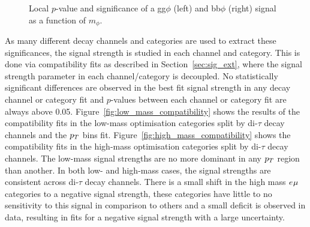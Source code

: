 \begin{figure}[!hbtp]
\centering
\caption{Local $p$-value and significance of a gg$\phi$ (left) and bb$\phi$ (right) signal as a function of $m_{\phi}$.}
\label{fig:significance}
\end{figure}

As many different decay channels and categories are used to extract these significances, the signal strength is studied in each channel and category.
This is done via compatibility fits as described in Section~\ref{sec:sig_ext}, where the signal strength parameter in each channel/category is decoupled.
No statistically significant differences are observed in the best fit signal strength in any decay channel or category fit and $p$-values between each channel or category fit are always above 0.05.
Figure~\ref{fig:low_mass_compatibility} shows the results of the compatibility fits in the low-mass optimisation categories split by di-$\tau$ decay channels and the $p_{T}$ bins fit. 
Figure~\ref{fig:high_mass_compatibility} shows the compatibility fits in the high-mass optimisation categories split by di-$\tau$ decay channels.
The low-mass signal strengths are no more dominant in any $p_{T}$ region than another.
In both low- and high-mass cases, the signal strengths are consistent across di-$\tau$ decay channels.
There is a small shift in the high mass $e_{}\mu_{}$ categories to a negative signal strength, these categories have little to no sensitivity to this signal in comparison to others and a small deficit is observed in data, resulting in fits for a negative signal strength with a large uncertainty. 


